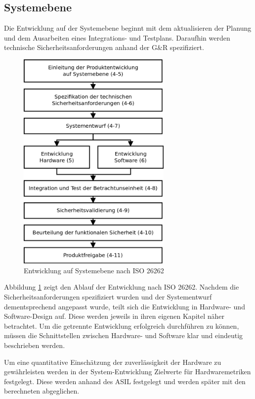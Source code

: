 \documentclass[a4paper,DIV=calc,ngerman]{scrartcl}
\begin{document}
\subsection{Systemebene}
\label{sec:Systemebene}
Die Entwicklung auf der Systemebene beginnt mit dem aktualisieren der Planung und dem Ausarbeiten eines Integrations- und Testplans. Daraufhin werden technische Sicherheitsanforderungen anhand der G\&R spezifiziert.

\begin{figure}
\includegraphics[width=7.5cm]{Abb_6_3}
\caption{Entwicklung auf Systemebene nach ISO 26262\cite{1}}
\label{fig:system}
\end{figure}

Abbildung \ref{fig:system} zeigt den Ablauf der Entwicklung nach ISO 26262. Nachdem die Sicherheitsanforderungen spezifiziert wurden und der Systementwurf dementsprechend angepasst wurde, teilt sich die Entwicklung in Hardware- und Software-Design auf. Diese werden jeweils in ihren eigenen Kapitel näher betrachtet. Um die getrennte Entwicklung erfolgreich durchführen zu können, müssen die Schnittstellen zwischen Hardware- und Software klar und eindeutig beschrieben werden.

Um eine quantitative Einschätzung der zuverlässigkeit der Hardware zu gewährleisten werden in der System-Entwicklung Zielwerte für Hardwaremetriken festgelegt. Diese werden anhand des ASIL festgelegt und werden später mit den berechneten abgeglichen.
\end{document}

